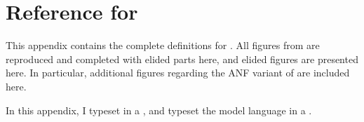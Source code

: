 \renewcommand{\techprefix}{refabscc}
\renewcommand{\tlang}{\abscctlang}
\renewcommand{\slang}{\absccslang}

\newcommand{\FigcCCObs}[1][t]{
  \begin{figure}[#1]
    \begin{bnfgrammar}
      \bnflabel{\abscctlang Observations} &
      \tv & \bnfdef & \ttruee \bnfalt \tfalsee
    \end{bnfgrammar}
    \caption{\abscctlang Observations}
    \label{fig:cccc:obs}
  \end{figure}
}

\newcommand{\FigCCObsRel}[1][t]{
  \begin{figure}[#1]
    \judgshape{\sv \approx \tv}
    \begin{mathpar}
      \struee \approx \ttruee

      \sfalsee \approx \tfalsee
    \end{mathpar}
    \caption{Observation Relation between \slang and \tlang}
    \label{fig:cccc:obs}
  \end{figure}
}

\chapter{Reference for \abscctlang}
\label{sec:abs-cc:appendix}
This appendix contains the complete definitions for \abscctlang.
All \abscctlang figures from  are reproduced and completed
with elided parts here, and elided figures are presented here.
In particular, additional figures regarding the ANF variant of \abscctlang are
included here.

\begin{typographical}
  In this appendix, I typeset \abscctlang in a \emph{}, and typeset the model language \slang in a \emph{}.
\end{typographical}

\begingroup
\let\label\discard

\FigCCCCSyntax[ht]

\endgroup

\FigCCCCSugar[ht]
\FigCCCCRedFull[ht]
\FigCCCCConv[ht]

\begingroup
\let\label\discard

\FigCCCCEqv[ht]
\FigCCCCSub[ht]

\endgroup

\FigCCCCTypingFullOne[ht]
\FigCCCCTypingFullTwo[ht]
\FigCCCCWF[ht]

